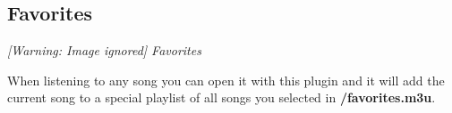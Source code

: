 \subsection{Favorites}
{\centering\itshape
  [Warning: Image ignored] %
 \newline
Favorites
\par}

When listening to any song you can open it with this plugin and it will
add the current song to a special playlist of all songs you selected in
\textbf{/favorites.m3u}.


